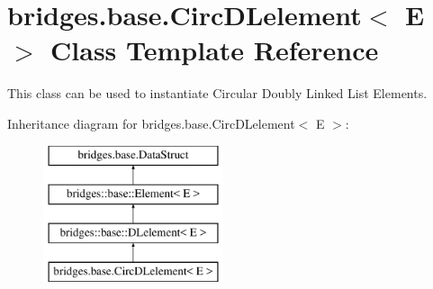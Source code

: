 \hypertarget{classbridges_1_1base_1_1_circ_d_lelement}{}\section{bridges.\+base.\+Circ\+D\+Lelement$<$ E $>$ Class Template Reference}
\label{classbridges_1_1base_1_1_circ_d_lelement}


This class can be used to instantiate Circular Doubly Linked List Elements.  


Inheritance diagram for bridges.\+base.\+Circ\+D\+Lelement$<$ E $>$\+:\begin{figure}[H]
\begin{center}
\leavevmode
\includegraphics[height=4.000000cm]{classbridges_1_1base_1_1_circ_d_lelement}
\end{center}
\end{figure}
